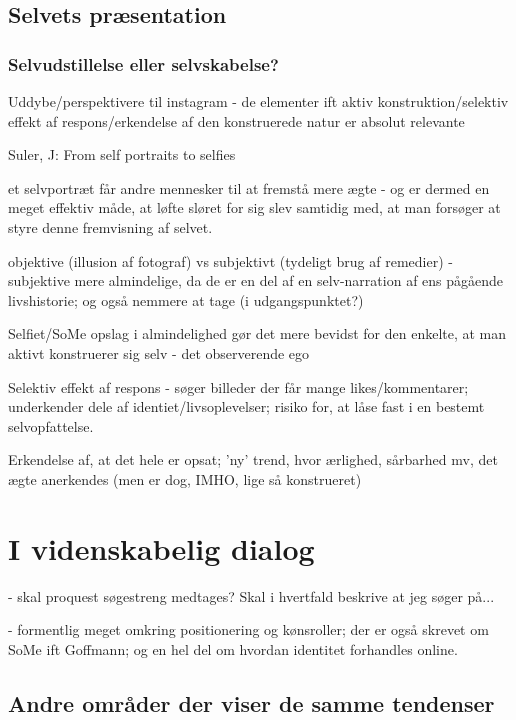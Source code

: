 \subsection{Selvets præsentation}

\subsubsection{Selvudstillelse eller selvskabelse?}

Uddybe/perspektivere til instagram - de elementer ift aktiv
konstruktion/selektiv effekt af respons/erkendelse af den
konstruerede natur er absolut relevante

Suler, J: From self portraits to selfies

et selvportræt får andre mennesker til at fremstå mere ægte - og
er dermed en meget effektiv måde, at løfte sløret for sig slev
samtidig med, at man forsøger at styre denne fremvisning af
selvet.

objektive (illusion af fotograf) vs subjektivt (tydeligt brug af
remedier) - subjektive mere almindelige, da de er en del af en
selv-narration af ens pågående livshistorie; og også nemmere at
tage (i udgangspunktet?)

Selfiet/SoMe opslag i almindelighed gør det mere bevidst for den
enkelte, at man aktivt konstruerer sig selv - det observerende ego

Selektiv effekt af respons - søger billeder der får mange
likes/kommentarer; underkender dele af identiet/livsoplevelser;
risiko for, at låse fast i en bestemt selvopfattelse.

Erkendelse af, at det hele er opsat; 'ny' trend, hvor ærlighed,
sårbarhed mv, det ægte anerkendes (men er dog, IMHO, lige så
konstrueret)

\section{I videnskabelig dialog}

- skal proquest søgestreng medtages? Skal i hvertfald beskrive at 
jeg søger på...

- formentlig meget omkring positionering og kønsroller; der er
også skrevet om SoMe ift Goffmann; og en hel del om hvordan
identitet forhandles online.

\subsection{Andre områder der viser de samme tendenser} 

